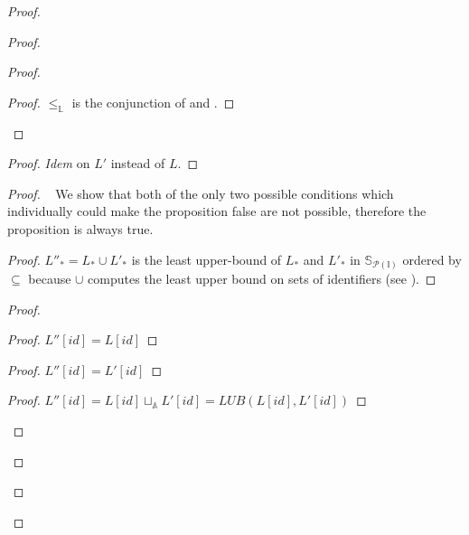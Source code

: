 \documentclass[9pt]{article}   	%
\begin{document}
\begin{proof}
\begin{proof}
\begin{proof}
			\qedstep
			\begin{proof}
				$\leq_\mathds{L}$ is the conjunction of  and .
			\end{proof}
		\end{proof}
		
		\begin{proof}
			\textit{Idem}  on $L'$ instead of $L$.
		\end{proof}
		
		\begin{proof}
			\pfsketch~ We show that both of the only two possible conditions which individually could make the proposition false are not possible, therefore the proposition is always true. 
			\begin{proof}
				$L''_* = L_* \cup L'_*$ is the least upper-bound of $L_*$ and $L'_*$ in $\mathds{S}_{\mathcal{P}(\mathds{I})}$ ordered by $\subseteq$ because $\cup$ computes the least upper bound on sets of identifiers (see \cite{lavoie2023statebased}).  
			\end{proof}
			\begin{proof}
				\begin{proof}
					$L''[\textit{id}] = L[\textit{id}]$
				\end{proof}
				
				\begin{proof}
					$L''[\textit{id}] = L'[\textit{id}]$
				\end{proof}
				
				\begin{proof}
					$L''[\textit{id}] = L[\textit{id}] \sqcup_\mathds{A} L'[\textit{id}] = \textit{LUB}(L[\textit{id}], L'[\textit{id}])$
				\end{proof}
				

\end{proof}
\end{proof}
\end{proof}
\end{proof}
\end{document}
